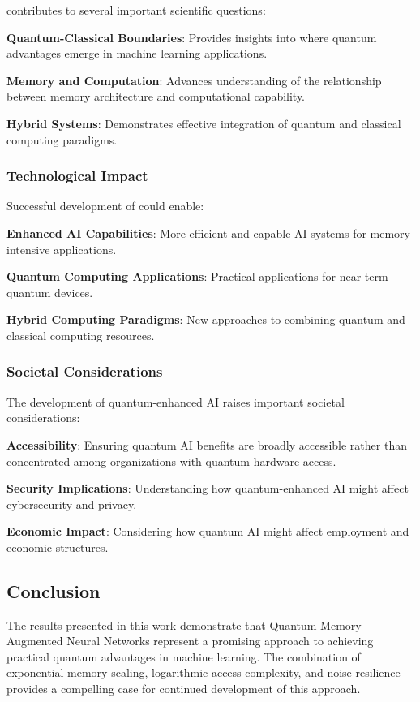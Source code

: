 \qmann contributes to several important scientific questions:

\textbf{Quantum-Classical Boundaries}: Provides insights into where quantum advantages emerge in machine learning applications.

\textbf{Memory and Computation}: Advances understanding of the relationship between memory architecture and computational capability.

\textbf{Hybrid Systems}: Demonstrates effective integration of quantum and classical computing paradigms.

\subsubsection{Technological Impact}

Successful development of \qmann could enable:

\textbf{Enhanced AI Capabilities}: More efficient and capable AI systems for memory-intensive applications.

\textbf{Quantum Computing Applications}: Practical applications for near-term quantum devices.

\textbf{Hybrid Computing Paradigms}: New approaches to combining quantum and classical computing resources.

\subsubsection{Societal Considerations}

The development of quantum-enhanced AI raises important societal considerations:

\textbf{Accessibility}: Ensuring quantum AI benefits are broadly accessible rather than concentrated among organizations with quantum hardware access.

\textbf{Security Implications}: Understanding how quantum-enhanced AI might affect cybersecurity and privacy.

\textbf{Economic Impact}: Considering how quantum AI might affect employment and economic structures.

\subsection{Conclusion}

The results presented in this work demonstrate that Quantum Memory-Augmented Neural Networks represent a promising approach to achieving practical quantum advantages in machine learning. The combination of exponential memory scaling, logarithmic access complexity, and noise resilience provides a compelling case for continued development of this approach.

